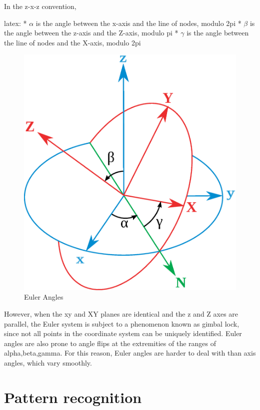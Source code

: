 \documentclass[12pt,a4,notitlepage]{report}
\renewcommand{\_}{\texttt{\symbol{95}}}
\newcommand{\<}{\texttt{\symbol{60}}}
\renewcommand{\>}{\texttt{\symbol{62}}}
\begin{document}
In the z-x-z convention,

{latex:
    * $\alpha$ is the angle between the x-axis and the line of nodes, modulo 2pi
    * $\beta$ is the angle between the z-axis and the Z-axis, modulo pi
    * $\gamma$ is the angle between the line of nodes and the X-axis, modulo 2pi
}

\begin{figure}[hb]
\centering
\includegraphics[scale=0.2,angle=0]{diagrams/eulerangles.ps}
\caption{Euler Angles}
\label{eulerangles}
\end{figure}

However, when the xy and XY planes are identical and the z and Z axes are parallel, the Euler system is subject to a phenomenon known as gimbal lock, since not all points in the coordinate system can be uniquely identified. Euler angles are also prone to angle flips at the extremities of the ranges of alpha,beta,gamma. For this reason, Euler angles are harder to deal with than axis angles, which vary smoothly.

\section{Pattern recognition}
\end{document}
